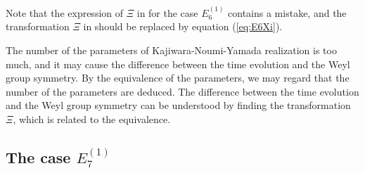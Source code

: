\documentclass[12pt]{amsart}
\numberwithin{equation}{section}
\theoremstyle{definition}
\begin{document}
Note that the expression of $\Xi $ in \cite{TsqP} for the case $E^{(1)}_6 $ contains a mistake, and the transformation $\Xi $ in \cite[Theorem 3.1 (i)]{TsqP} should be replaced by equation (\ref{eq:E6Xi}).

The number of the parameters of Kajiwara-Noumi-Yamada realization is too much, and it may cause the difference between the time evolution and the Weyl group symmetry.
By the equivalence of the parameters, we may regard that the number of the parameters are deduced.
The difference between the time evolution and the Weyl group symmetry can be understood by finding the transformation $\Xi $, which is related to the equivalence.

\subsection{The case $E^{(1)}_7 $} \label{sec:E17}
\end{document}
